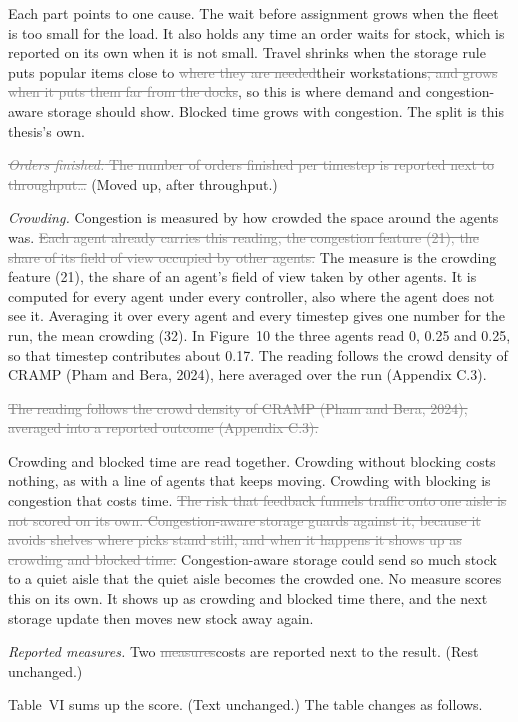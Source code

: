 \documentclass[11pt,a4paper]{article}
\newcommand{\new}[1]{\textcolor{newc}{#1}}
\newcommand{\old}[1]{\textcolor{gray}{\sout{#1}}}
\begin{document}
Each part points to one cause. The wait before assignment grows when the
fleet is too small for the load. It also holds any time an order waits for
stock, which is reported on its own when it is not small. Travel shrinks when
the storage rule puts popular items close to \old{where they are
needed}\new{their workstations}\old{, and grows when it puts them far from
the docks}, so this is where demand and congestion-aware storage should
show. Blocked time grows with congestion. The split is this thesis's own.

\old{\textit{Orders finished.} The number of orders finished per timestep is
reported next to throughput\ldots{}} (Moved up, after throughput.)

\textit{Crowding.} Congestion is measured by how crowded the space around the
agents was. \old{Each agent already carries this reading, the congestion
feature (21), the share of its field of view occupied by other agents.}
\new{The measure is the crowding feature (21), the share of an agent's field
of view taken by other agents. It is computed for every agent under every
controller, also where the agent does not see it.} Averaging it over every
agent and every timestep gives one number for the run, the mean crowding
(32). In Figure~10 the three agents read 0, 0.25 and 0.25, so that timestep
contributes about 0.17. \new{The reading follows the crowd density of CRAMP
(Pham and Bera, 2024), here averaged over the run (Appendix C.3).}

\old{The reading follows the crowd density of CRAMP (Pham and Bera, 2024),
averaged into a reported outcome (Appendix C.3).}

Crowding and blocked time are read together. Crowding without blocking costs
nothing, as with a line of agents that keeps moving. Crowding with blocking
is congestion that costs time. \old{The risk that feedback funnels traffic
onto one aisle is not scored on its own. Congestion-aware storage guards
against it, because it avoids shelves where picks stand still, and when it
happens it shows up as crowding and blocked time.} \new{Congestion-aware
storage could send so much stock to a quiet aisle that the quiet aisle
becomes the crowded one. No measure scores this on its own. It shows up as
crowding and blocked time there, and the next storage update then moves new
stock away again.}

\textit{Reported measures.} Two \old{measures}\new{costs} are reported next
to the result. (Rest unchanged.)

Table~VI sums up the score. (Text unchanged.) The table changes as follows.
\end{document}
